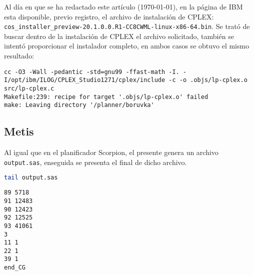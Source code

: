 \documentclass[a4paper,12pt,twocolumn]{article}
\begin{document}
Al día en que se ha redactado este artículo (\today), en la página de IBM esta disponible, previo registro, el archivo de instalación de CPLEX: \texttt{cos\_installer\_preview-20.1.0.0.R1-CC8CWML-linux-x86-64.bin}. Se trató de buscar dentro de la instalación de CPLEX el archivo solicitado, también se intentó proporcionar el instalador completo, en ambos casos se obtuvo el mismo resultado:

\begin{lstlisting}[style=consola]
cc -O3 -Wall -pedantic -std=gnu99 -ffast-math -I. -I/opt/ibm/ILOG/CPLEX_Studio1271/cplex/include -c -o .objs/lp-cplex.o src/lp-cplex.c
Makefile:239: recipe for target '.objs/lp-cplex.o' failed
make: Leaving directory '/planner/boruvka'
\end{lstlisting}

\subsection{Metis}

Al igual que en el planificador Scorpion, el presente genera un archivo \texttt{output.sas}, enseguida se presenta el final de dicho archivo.

\begin{lstlisting}[language=sh]
  tail output.sas
\end{lstlisting}
\begin{lstlisting}[style=consola]
89 5718
91 12483
90 12423
92 12525
93 41061
3
11 1
22 1
39 1
end_CG
\end{lstlisting}
\end{document}

